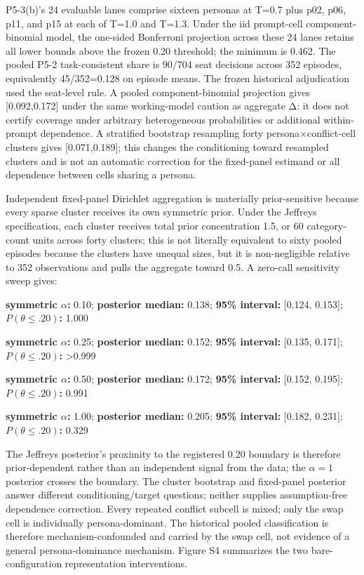 \documentclass[11pt]{article}
\begin{document}
P5-3(b)'s 24 evaluable lanes comprise sixteen personas at T=0.7 plus
p02, p06, p11, and p15 at each of T=1.0 and T=1.3. Under the iid
prompt-cell component-binomial model, the one-sided Bonferroni
projection across these 24 lanes retains all lower bounds above the
frozen 0.20 threshold; the minimum is 0.462. The pooled P5-2
task-consistent share is 90/704 seat decisions across 352 episodes,
equivalently 45/352=0.128 on episode means. The frozen historical
adjudication used the seat-level rule. A pooled component-binomial
projection gives {[}0.092,0.172{]} under the same working-model caution
as aggregate Δ: it does not certify coverage under arbitrary
heterogeneous probabilities or additional within-prompt dependence. A
stratified bootstrap resampling forty persona×conflict-cell clusters
gives {[}0.071,0.189{]}; this changes the conditioning toward resampled
clusters and is not an automatic correction for the fixed-panel estimand
or all dependence between cells sharing a persona.

Independent fixed-panel Dirichlet aggregation is materially
prior-sensitive because every sparse cluster receives its own symmetric
prior. Under the Jeffreys specification, each cluster receives total
prior concentration 1.5, or 60 category-count units across forty
clusters; this is not literally equivalent to sixty pooled episodes
because the clusters have unequal sizes, but it is non-negligible
relative to 352 observations and pulls the aggregate toward 0.5. A
zero-call sensitivity sweep gives:

\textbf{symmetric \(\alpha\):} 0.10; \textbf{posterior median:} 0.138;
\textbf{95\% interval:} {[}0.124, 0.153{]};
\textbf{\(P(\theta\le .20)\):} 1.000

\textbf{symmetric \(\alpha\):} 0.25; \textbf{posterior median:} 0.152;
\textbf{95\% interval:} {[}0.135, 0.171{]};
\textbf{\(P(\theta\le .20)\):} \textgreater0.999

\textbf{symmetric \(\alpha\):} 0.50; \textbf{posterior median:} 0.172;
\textbf{95\% interval:} {[}0.152, 0.195{]};
\textbf{\(P(\theta\le .20)\):} 0.991

\textbf{symmetric \(\alpha\):} 1.00; \textbf{posterior median:} 0.205;
\textbf{95\% interval:} {[}0.182, 0.231{]};
\textbf{\(P(\theta\le .20)\):} 0.329

The Jeffreys posterior's proximity to the registered 0.20 boundary is
therefore prior-dependent rather than an independent signal from the
data; the \(\alpha=1\) posterior crosses the boundary. The cluster
bootstrap and fixed-panel posterior answer different conditioning/target
questions; neither supplies assumption-free dependence correction. Every
repeated conflict subcell is mixed; only the swap cell is individually
persona-dominant. The historical pooled classification is therefore
mechanism-confounded and carried by the swap cell, not evidence of a
general persona-dominance mechanism. Figure S4 summarizes the two
bare-configuration representation interventions.
\end{document}
